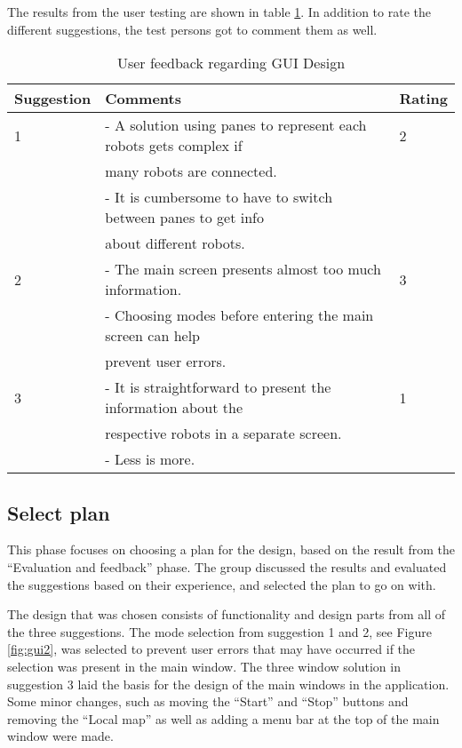 The results from the user testing are shown in table \ref{tab:guifeedback}. In addition to rate the different suggestions, the test persons got to comment them as well.

\begin{table}[ht]
\begin{center}
\begin{tabular}{|l|l|l|} 
\hline
Suggestion  &   Comments & Rating \\
 \hline
1           &   - A solution using panes to represent each robots gets complex if & 2\\
            &   many robots are connected. & \\
            &   - It is cumbersome to have to switch between panes to get info &\\
            &   about different robots. & \\
\hline
2           &   - The main screen presents almost too much information.  & 3\\
            &   - Choosing modes before entering the main screen can help &\\
            &   prevent user errors.  &\\
\hline
3           &   - It is straightforward to present the information about the & 1\\
            &   respective robots in a separate screen.  &\\
            &   - Less is more.  &\\
\hline
\end{tabular}
\end{center}
\caption{User feedback regarding GUI Design}
\label{tab:guifeedback}
\end{table}


\subsection{Select plan}
\label{sec:selectplan}
This phase focuses on choosing a plan for the design, based on the result from the ``Evaluation and feedback'' phase. The group discussed the results and evaluated the suggestions based on their experience, and selected the plan to go on with.

The design that was chosen consists of functionality and design parts from all of the three suggestions. The mode selection from suggestion 1 and 2, see Figure \ref{fig:gui2}, was selected to prevent user errors that may have occurred if the selection was present in the main window. The three window solution in suggestion 3 laid the basis for the design of the main windows in the application. Some minor changes, such as moving the ``Start'' and ``Stop'' buttons and removing the ``Local map'' as well as adding a menu bar at the top of the main window were made. 